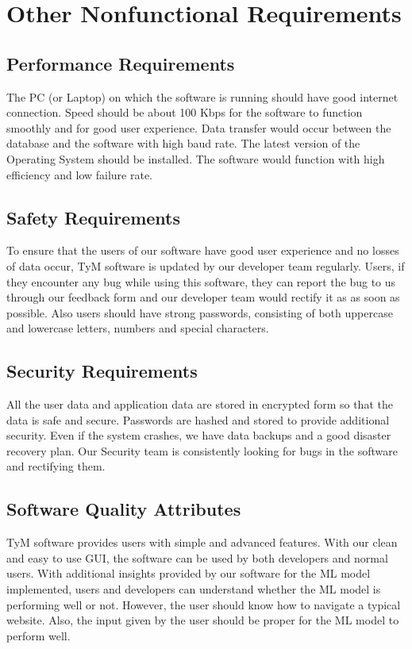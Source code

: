 \documentclass[12pt]{scrreprt}
\begin{document}
\chapter{Other Nonfunctional Requirements}

\section{Performance Requirements}
The PC (or Laptop) on which the software is running should have good internet connection. Speed should be about 100 Kbps for the software to function smoothly and for good user experience. Data transfer would occur between the database and the software with high baud rate. The latest version of the Operating System should be installed. The software would function with high efficiency and low failure rate.

\section{Safety Requirements}
To ensure that the users of our software have good user experience and no losses of data occur, TyM software is updated by our developer team regularly. Users, if they encounter any bug while using this software, they can report the bug to us through our feedback form and our developer team would rectify it as as soon as possible. Also users should have strong passwords, consisting of both uppercase and lowercase letters, numbers and special characters. 

\section{Security Requirements}
All the user data and application data are stored in encrypted form so that the data is safe and secure. Passwords are hashed and stored to provide additional security. Even if the system crashes, we have data backups and a good disaster recovery plan. Our Security team is consistently looking for bugs in the software and rectifying them.

\section{Software Quality Attributes}
TyM software provides users with simple and advanced features. With our clean and easy to use GUI, the software can be used by both developers and normal users. With additional insights provided by our software for the ML model implemented, users and developers can understand whether the ML model is performing well or not. However, the user should know how to navigate a typical website. Also, the input given by the user should be proper for the ML model to perform well.
\end{document}
